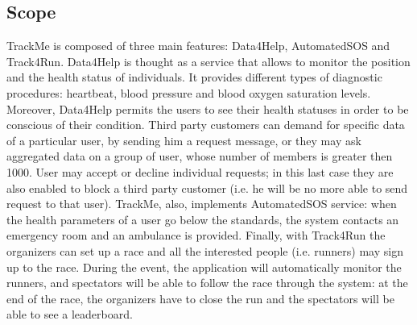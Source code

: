 \subsection{Scope}
TrackMe is composed of three main features: Data4Help, AutomatedSOS and Track4Run.
Data4Help is thought as a service that allows to monitor the position and the health status of individuals. 
It provides different types of diagnostic procedures: heartbeat, blood pressure and blood oxygen saturation levels. 
Moreover, Data4Help permits the users to see their health statuses in order to be conscious of their condition. 
Third party customers can demand for specific data of a particular user, by sending him a request message, or they may ask aggregated data
on a group of user, whose number of members is greater then 1000. User may accept or decline individual requests; in this last case they are
also enabled to block a third party customer (i.e. he will be no more able to send request to that user).
TrackMe, also, implements AutomatedSOS service: when the health parameters of a user go below the standards, the system contacts an emergency
room and an ambulance is provided. 
Finally, with Track4Run the organizers can set up a race and all the interested people (i.e. runners) may sign up to the race. 
During the event, the application will automatically monitor the runners, and spectators will be able to follow the race through the system: 
at the end of the race, the organizers have to close the run and the spectators will be able to see a leaderboard. 